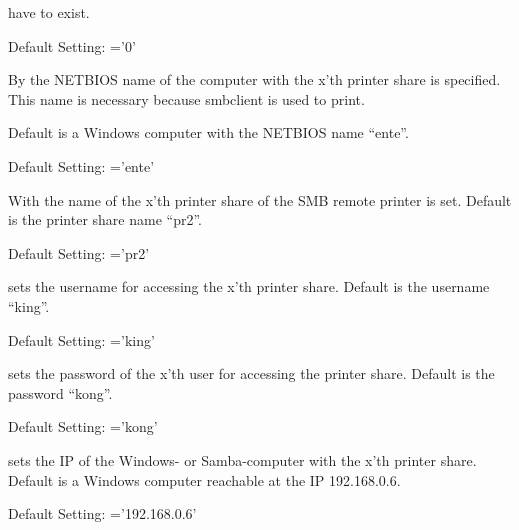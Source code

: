 \begin{description}
  have to exist.

  Default Setting: ='0'



  By  the NETBIOS name of the computer
  with the x'th printer share is specified. This name is necessary because
  smbclient is used to print.

  Default is a Windows computer with the NETBIOS name ``ente''.

  Default Setting: ='ente'


  With  the name of the x'th
  printer share of the SMB remote printer is set. Default is the printer
  share name ``pr2''.

  Default Setting: ='pr2'


   sets the username for accessing the
  x'th printer share. Default is the username ``king''.

  Default Setting: ='king'



   sets the password of the x'th
  user for accessing the printer share. Default is the password ``kong''.

  Default Setting: ='kong'



   sets the IP of the Windows- or
  Samba-computer with the x'th printer share. Default is a Windows
  computer reachable at the IP 192.168.0.6.

  Default Setting: ='192.168.0.6'


\end{description}


